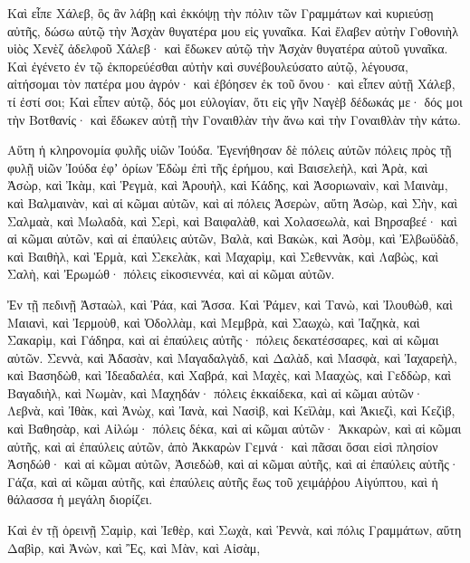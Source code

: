 {\par }{\PP {}Καὶ εἶπε Χάλεβ, ὃς ἂν λάβῃ καὶ ἐκκόψῃ τὴν πόλιν τῶν Γραμμάτων καὶ κυριεύσῃ αὐτῆς, δώσω αὐτῷ τὴν Ἀσχὰν θυγατέρα μου εἰς γυναῖκα.
Καὶ ἔλαβεν αὐτὴν Γοθονιὴλ υἱὸς Χενὲζ ἀδελφοῦ Χάλεβ· καὶ ἔδωκεν αὐτῷ τὴν Ἀσχὰν θυγατέρα αὐτοῦ γυναῖκα.
Καὶ ἐγένετο ἐν τῷ ἐκπορεύέσθαι αὐτὴν καὶ συνέβουλεύσατο αὐτῷ, λέγουσα, αἰτήσομαι τὸν πατέρα μου ἀγρόν· καὶ ἐβόησεν ἐκ τοῦ ὄνου· καὶ εἶπεν αὐτῇ Χάλεβ, τί ἐστί σοι;
Καὶ εἶπεν αὐτῷ, δός μοι εὐλογίαν, ὅτι εἰς γῆν Ναγὲβ δέδωκάς με· δός μοι τὴν Βοτθανίς· καὶ ἔδωκεν αὐτῇ τὴν Γοναιθλὰν τὴν ἄνω καὶ τὴν Γοναιθλὰν τὴν κάτω.
\par }{\PP {}Αὕτη ἡ κληρονομία φυλῆς υἱῶν Ἰούδα.
Ἐγενήθησαν δὲ πόλεις αὐτῶν πόλεις πρὸς τῇ φυλῇ υἱῶν Ἰούδα ἐφʼ ὁρίων Ἐδὼμ ἐπὶ τῆς ἐρήμου, καὶ Βαισελεὴλ, καὶ Ἀρὰ, καὶ Ἀσὼρ,
καὶ Ἰκὰμ, καὶ Ῥεγμὰ, καὶ Ἀρουὴλ,
καὶ Κάδης, καὶ Ἀσοριωναὶν, καὶ Μαινὰμ,
καὶ Βαλμαινὰν, καὶ αἱ κῶμαι αὐτῶν,
καὶ αἱ πόλεις Ἀσερὼν, αὕτη Ἀσὼρ,
καὶ Σὴν, καὶ Σαλμαὰ, καὶ Μωλαδὰ,
καὶ Σερὶ, καὶ Βαιφαλὰθ,
καὶ Χολασεωλὰ, καὶ Βηρσαβεέ· καὶ αἱ κῶμαι αὐτῶν, καὶ αἱ ἐπαύλεις αὐτῶν,
Βαλὰ, καὶ Βακὼκ, καὶ Ἀσὸμ,
καὶ Ἐλβωϋδὰδ, καὶ Βαιθὴλ, καὶ Ἑρμὰ,
καὶ Σεκελὰκ, καὶ Μαχαρὶμ, καὶ Σεθεννὰκ,
καὶ Λαβὼς, καὶ Σαλὴ, καὶ Ἐρωμώθ· πόλεις εἰκοσιεννέα, καὶ αἱ κῶμαι αὐτῶν.
\par }{\PP {}Ἐν τῇ πεδινῇ Ἀσταὼλ, καὶ Ῥάα, καὶ Ἄσσα.
Καὶ Ῥάμεν, καὶ Τανὼ, καὶ Ἰλουθὼθ, καὶ Μαιανὶ,
καὶ Ἰερμοὺθ, καὶ Ὀδολλὰμ, καὶ Μεμβρὰ, καὶ Σαωχὼ, καὶ Ἰαζηκὰ,
καὶ Σακαρὶμ, καὶ Γάδηρα, καὶ αἱ ἐπαύλεις αὐτῆς· πόλεις δεκατέσσαρες, καὶ αἱ κῶμαι αὐτῶν.
Σεννὰ, καὶ Ἀδασὰν, καὶ Μαγαδαλγὰδ,
καὶ Δαλὰδ, καὶ Μασφὰ, καὶ Ἰαχαρεὴλ,
καὶ Βασηδὼθ, καὶ Ἰδεαδαλέα, καὶ
Χαβρά, καὶ Μαχὲς, καὶ Μααχὼς,
καὶ Γεδδὼρ, καὶ Βαγαδιὴλ, καὶ Νωμὰν, καὶ Μαχηδάν· πόλεις ἑκκαίδεκα, καὶ αἱ κῶμαι αὐτῶν·
Λεβνὰ, καὶ Ἰθὰκ, καὶ Ἀνὼχ,
καὶ Ἰανὰ, καὶ Νασὶβ,
καὶ Κεϊλὰμ, καὶ Ἀκιεζὶ, καὶ Κεζὶβ, καὶ Βαθησὰρ, καὶ Αἰλώμ· πόλεις δέκα, καὶ αἱ κῶμαι αὐτῶν·
Ἀκκαρὼν, καὶ αἱ κῶμαι αὐτῆς, καὶ αἱ ἐπαύλεις αὐτῶν,
ἀπὸ Ἀκκαρὼν Γεμνά· καὶ πᾶσαι ὅσαι εἰσὶ πλησίον Ἀσηδώθ· καὶ αἱ κῶμαι αὐτῶν,
Ἀσιεδὼθ, καὶ αἱ κῶμαι αὐτῆς, καὶ αἱ ἐπαύλεις αὐτῆς· Γάζα, καὶ αἱ κῶμαι αὐτῆς, καὶ ἐπαύλεις αὐτῆς ἕως τοῦ χειμάῤῥου Αἰγύπτου, καὶ ἡ θάλασσα ἡ μεγάλη διορίζει.
\par }{\PP {}Καὶ ἐν τῇ ὀρεινῇ Σαμὶρ, καὶ Ἰεθὲρ, καὶ Σωχὰ,
καὶ Ῥεννὰ, καὶ πόλις Γραμμάτων, αὕτη Δαβὶρ,
καὶ Ἀνὼν, καὶ Ἒς, καὶ Μὰν, καὶ Αἰσὰμ,
}
